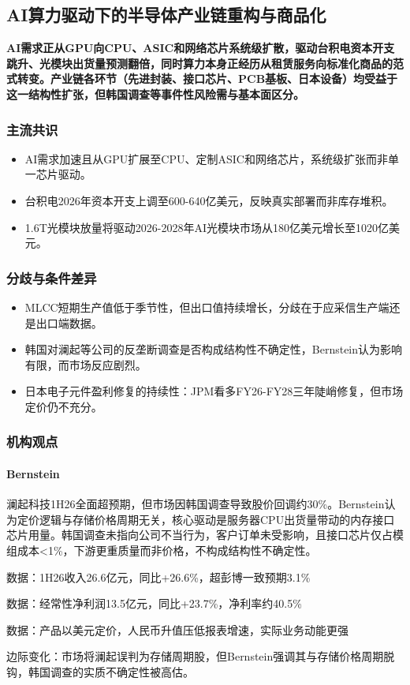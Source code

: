 \documentclass[11pt]{ctexart}
\begin{document}
\subsection{AI算力驱动下的半导体产业链重构与商品化}
\textbf{AI需求正从GPU向CPU、ASIC和网络芯片系统级扩散，驱动台积电资本开支跳升、光模块出货量预测翻倍，同时算力本身正经历从租赁服务向标准化商品的范式转变。产业链各环节（先进封装、接口芯片、PCB基板、日本设备）均受益于这一结构性扩张，但韩国调查等事件性风险需与基本面区分。}
\subsubsection*{主流共识}
\begin{itemize}
  \item AI需求加速且从GPU扩展至CPU、定制ASIC和网络芯片，系统级扩张而非单一芯片驱动。
  \item 台积电2026年资本开支上调至600-640亿美元，反映真实部署而非库存堆积。
  \item 1.6T光模块放量将驱动2026-2028年AI光模块市场从180亿美元增长至1020亿美元。
\end{itemize}
\subsubsection*{分歧与条件差异}
\begin{itemize}
  \item MLCC短期生产值低于季节性，但出口值持续增长，分歧在于应采信生产端还是出口端数据。
  \item 韩国对澜起等公司的反垄断调查是否构成结构性不确定性，Bernstein认为影响有限，而市场反应剧烈。
  \item 日本电子元件盈利修复的持续性：JPM看多FY26-FY28三年陡峭修复，但市场定价仍不充分。
\end{itemize}
\subsubsection*{机构观点}
\paragraph{Bernstein} 澜起科技1H26全面超预期，但市场因韩国调查导致股价回调约30\%。Bernstein认为定价逻辑与存储价格周期无关，核心驱动是服务器CPU出货量带动的内存接口芯片用量。韩国调查未指向公司不当行为，客户订单未受影响，且接口芯片仅占模组成本<1\%，下游更重质量而非价格，不构成结构性不确定性。
{\small\color{refgray}数据：1H26收入26.6亿元，同比+26.6\%，超彭博一致预期3.1\%\par}
{\small\color{refgray}数据：经常性净利润13.5亿元，同比+23.7\%，净利率约40.5\%\par}
{\small\color{refgray}数据：产品以美元定价，人民币升值压低报表增速，实际业务动能更强\par}
{\small\color{refgray}边际变化：市场将澜起误判为存储周期股，但Bernstein强调其与存储价格周期脱钩，韩国调查的实质不确定性被高估。\par}
\end{document}

